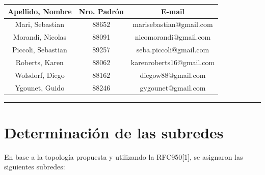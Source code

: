 \documentclass[12pt,titlepage]{article}
\begin{document}
\begin{titlepage}
\begin{center}
\large\addtolength{\tabcolsep}{-3pt}
\begin{tabular}{|| c | c | c ||}
  \hline
    \textbf{Apellido, Nombre} & \textbf{Nro. Padrón} & \textbf{E-mail} \\
  \hline
    Mari, Sebastian & 88652 & marisebastian@gmail.com \\
  \hline
    Morandi, Nicolas & 88091 & nicomorandi@gmail.com \\
  \hline
    Piccoli, Sebastian & 89257 & seba.piccoli@gmail.com \\
  \hline
    Roberts, Karen & 88062 & karenroberts16@gmail.com \\
  \hline
    Wolsdorf, Diego & 88162 & diegow88@gmail.com \\
  \hline
    Ygounet, Guido & 88246 & gygounet@gmail.com \\
  \hline
\end{tabular}
\end{center}

\vfill

\hrule
\vspace{0.2cm}



\end{titlepage}



\setcounter{page}{1}

\tableofcontents
\newpage



\section{Determinación de las subredes}

En base a la topolog\'ia propuesta y utilizando la RFC950[1], se asignaron las siguientes subredes:
\end{document}

